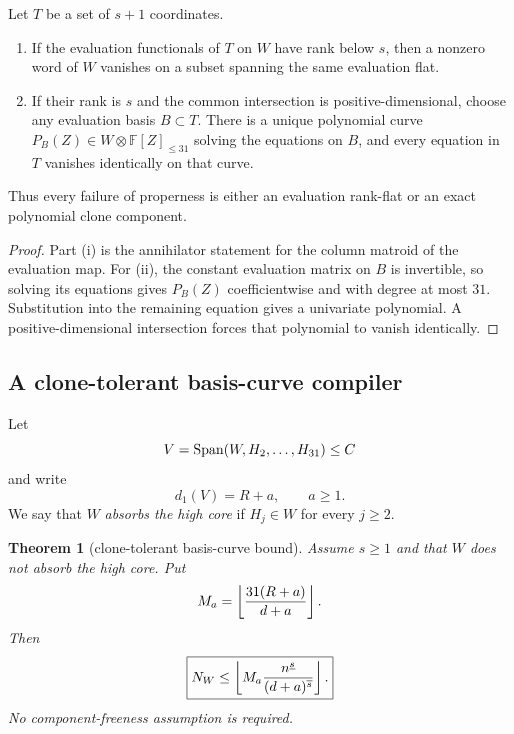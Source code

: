 \documentclass[11pt,a4paper]{amsart}
\numberwithin{equation}{section}
\newtheorem{theorem}{Theorem}[section]
\theoremstyle{remark}
\newcommand{\F}{\mathbb F}\newcommand{\B}{\mathbb B}\newcommand{\K}{\mathbb K}\newcommand{\Z}{\mathbb Z}
\newcommand{\fall}[2]{#1^{\underline{#2}}}\newcommand{\rise}[2]{#1^{\overline{#2}}}
\begin{document}
\begin{lemma}\label{lem:nonproper}
Let $T$ be a set of $s+1$ coordinates.
\begin{enumerate}[label=\textup{(\roman*)}]
\item If the evaluation functionals of $T$ on $W$ have rank below $s$, then a nonzero word of $W$ vanishes on a subset spanning the same evaluation flat.
\item If their rank is $s$ and the common intersection is positive-dimensional, choose any evaluation basis $B\subset T$.  There is a unique polynomial curve $P_B(Z)\in W\otimes\F[Z]_{\le31}$ solving the equations on $B$, and every equation in $T$ vanishes identically on that curve.
\end{enumerate}
Thus every failure of properness is either an evaluation rank-flat or an exact polynomial clone component.
\end{lemma}

\begin{proof}
Part (i) is the annihilator statement for the column matroid of the evaluation map.  For (ii), the constant evaluation matrix on $B$ is invertible, so solving its equations gives $P_B(Z)$ coefficientwise and with degree at most $31$.  Substitution into the remaining equation gives a univariate polynomial.  A positive-dimensional intersection forces that polynomial to vanish identically.
\end{proof}

\subsection{A clone-tolerant basis-curve compiler}

Let
\[
 V=\operatorname{Span}(W,H_2,\ldots,H_{31})\le C
\]
and write
\begin{equation}\label{eq:a}
 d_1(V)=R+a,
 \qquad a\ge1.
\end{equation}
We say that $W$ \emph{absorbs the high core} if $H_j\in W$ for every $j\ge2$.

\begin{theorem}[clone-tolerant basis-curve bound]\label{thm:clone-tolerant}
Assume $s\ge1$ and that $W$ does not absorb the high core.  Put
\begin{equation}\label{eq:Ma}
 M_a=\left\lfloor \frac{31(R+a)}{d+a}\right\rfloor.
\end{equation}
Then
\begin{equation}\label{eq:clone-tolerant}
 \boxed{
 N_W\le
 \floor{
 M_a\frac{\fall ns}{\rise{(d+a)}s}
 }.
 }
\end{equation}
No component-freeness assumption is required.
\end{theorem}
\end{document}
